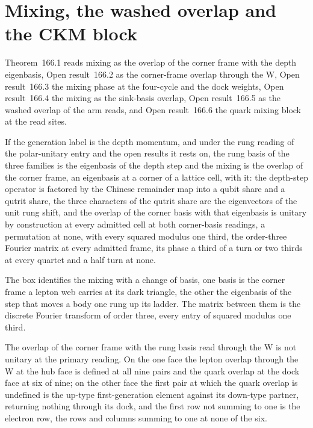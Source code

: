 \section{Mixing, the washed overlap and the CKM block}\label{mod:VI-7-mixing-the-washed-overlap-and-the-ckm-block}
\label{narr:open:6-7}Theorem~166.1 reads mixing as the overlap of the corner frame with the depth eigenbasis, Open result~166.2 as the corner-frame overlap through the W, Open result~166.3 the mixing phase at the four-cycle and the dock weights, Open result~166.4 the mixing as the sink-basis overlap, Open result~166.5 as the washed overlap of the arm reads, and Open result~166.6 the quark mixing block at the read sites.
\begin{chconditional}\label{box:VI-7-mixing-the-washed-overlap-and-the-ckm-block:1}
If the generation label is the depth momentum, and under the rung reading of the polar-unitary entry and the open results it rests on, the rung basis of the three families is the eigenbasis of the depth step and the mixing is the overlap of the corner frame, an eigenbasis at a corner of a lattice cell, with it: the depth-step operator is factored by the Chinese remainder map into a qubit share and a qutrit share, the three characters of the qutrit share are the eigenvectors of the unit rung shift, and the overlap of the corner basis with that eigenbasis is unitary by construction at every admitted cell at both corner-basis readings, a permutation at none, with every squared modulus one third, the order-three Fourier matrix at every admitted frame, its phase a third of a turn or two thirds at every quartet and a half turn at none.
\end{chconditional}
The box identifies the mixing with a change of basis, one basis is the corner frame a lepton web carries at its dark triangle, the other the eigenbasis of the step that moves a body one rung up its ladder. The matrix between them is the discrete Fourier transform of order three, every entry of squared modulus one third.
\begin{chwall}\label{box:VI-7-mixing-the-washed-overlap-and-the-ckm-block:2}
The overlap of the corner frame with the rung basis read through the W is not unitary at the primary reading. On the one face the lepton overlap through the W at the hub face is defined at all nine pairs and the quark overlap at the dock face at six of nine; on the other face the first pair at which the quark overlap is undefined is the up-type first-generation element against its down-type partner, returning nothing through its dock, and the first row not summing to one is the electron row, the rows and columns summing to one at none of the six.
\end{chwall}
